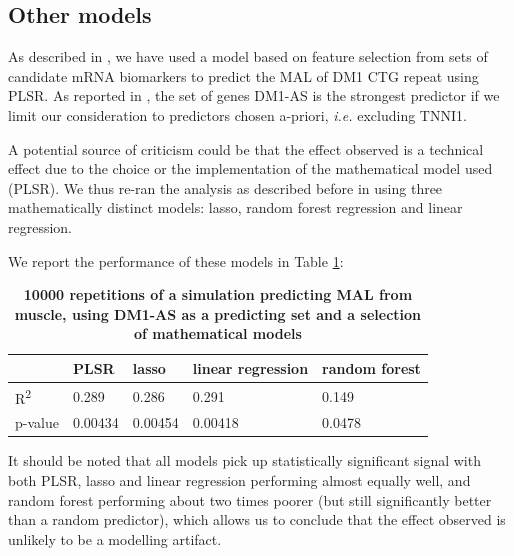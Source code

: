 \documentclass[10pt,letterpaper]{article}
\begin{document}
\subsection*{Other models}

As described in , we have used a model based on feature selection from sets of candidate mRNA biomarkers to predict the MAL of DM1 CTG repeat using PLSR. As reported in , the set of genes DM1-AS is the strongest predictor if we limit our consideration to predictors chosen a-priori, {\it i.e.} excluding TNNI1.

A potential source of criticism could be that the effect observed is a technical effect due to the choice or the implementation of the mathematical model used (PLSR). We thus re-ran the analysis as described before in  using three mathematically distinct models: lasso, random forest regression and linear regression.

We report the performance of these models in Table \ref{model_comparison}:

\begin{table}[!ht]
\begin{adjustwidth}{-2.25in}{0in} %
\centering
\caption{{\bf 10000 repetitions of a simulation predicting MAL from muscle, using DM1-AS as a predicting set and a selection of mathematical models}}

\begin{tabular}{|l|l|l|l|l|}
\hline
 & PLSR & lasso & linear regression & random forest \\ \hline
R\textsuperscript{2} & 0.289 & 0.286 & 0.291 & 0.149 \\ \hline
p-value & 0.00434 & 0.00454 & 0.00418 & 0.0478 \\ \hline
\end{tabular}

\label{model_comparison}
\end{adjustwidth}
\end{table}

It should be noted that all models pick up statistically significant signal with both PLSR, lasso and linear regression performing almost equally well, and random forest performing about two times poorer (but still significantly better than a random predictor), which allows us to conclude that the effect observed is unlikely to be a modelling artifact.

\end{document}
